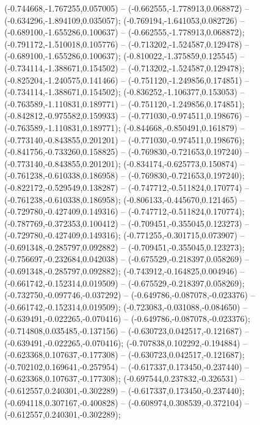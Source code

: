  (-0.744668,-1.767255,0.057005) -- (-0.662555,-1.778913,0.068872) -- (-0.634296,-1.894109,0.035057);
 (-0.769194,-1.641053,0.082726) -- (-0.689100,-1.655286,0.100637) -- (-0.662555,-1.778913,0.068872);
 (-0.791172,-1.510018,0.105776) -- (-0.713202,-1.524587,0.129478) -- (-0.689100,-1.655286,0.100637);
 (-0.810022,-1.375859,0.125545) -- (-0.734114,-1.388671,0.154502) -- (-0.713202,-1.524587,0.129478);
 (-0.825204,-1.240575,0.141466) -- (-0.751120,-1.249856,0.174851) -- (-0.734114,-1.388671,0.154502);
 (-0.836252,-1.106377,0.153053) -- (-0.763589,-1.110831,0.189771) -- (-0.751120,-1.249856,0.174851);
 (-0.842812,-0.975582,0.159933) -- (-0.771030,-0.974511,0.198676) -- (-0.763589,-1.110831,0.189771);
 (-0.844668,-0.850491,0.161879) -- (-0.773140,-0.843855,0.201201) -- (-0.771030,-0.974511,0.198676);
 (-0.841756,-0.733260,0.158825) -- (-0.769830,-0.721653,0.197240) -- (-0.773140,-0.843855,0.201201);
 (-0.834174,-0.625773,0.150874) -- (-0.761238,-0.610338,0.186958) -- (-0.769830,-0.721653,0.197240);
 (-0.822172,-0.529549,0.138287) -- (-0.747712,-0.511824,0.170774) -- (-0.761238,-0.610338,0.186958);
 (-0.806133,-0.445670,0.121465) -- (-0.729780,-0.427409,0.149316) -- (-0.747712,-0.511824,0.170774);
 (-0.787769,-0.372353,0.100412) -- (-0.709451,-0.355045,0.123273) -- (-0.729780,-0.427409,0.149316);
 (-0.771255,-0.301715,0.073907) -- (-0.691348,-0.285797,0.092882) -- (-0.709451,-0.355045,0.123273);
 (-0.756697,-0.232684,0.042038) -- (-0.675529,-0.218397,0.058269) -- (-0.691348,-0.285797,0.092882);
 (-0.743912,-0.164825,0.004946) -- (-0.661742,-0.152314,0.019509) -- (-0.675529,-0.218397,0.058269);
 (-0.732750,-0.097746,-0.037292) -- (-0.649786,-0.087078,-0.023376) -- (-0.661742,-0.152314,0.019509);
 (-0.723083,-0.031088,-0.084650) -- (-0.639491,-0.022265,-0.070416) -- (-0.649786,-0.087078,-0.023376);
 (-0.714808,0.035485,-0.137156) -- (-0.630723,0.042517,-0.121687) -- (-0.639491,-0.022265,-0.070416);
 (-0.707838,0.102292,-0.194884) -- (-0.623368,0.107637,-0.177308) -- (-0.630723,0.042517,-0.121687);
 (-0.702102,0.169641,-0.257954) -- (-0.617337,0.173450,-0.237440) -- (-0.623368,0.107637,-0.177308);
 (-0.697544,0.237832,-0.326531) -- (-0.612557,0.240301,-0.302289) -- (-0.617337,0.173450,-0.237440);
 (-0.694118,0.307167,-0.400828) -- (-0.608974,0.308539,-0.372104) -- (-0.612557,0.240301,-0.302289);
